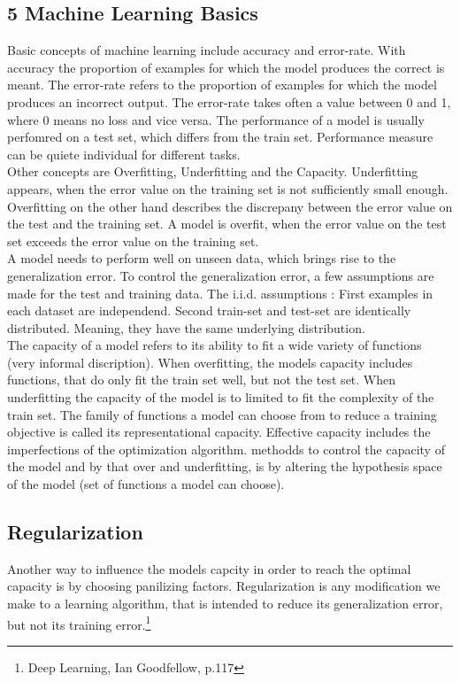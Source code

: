 \documentclass[12pt, a4paper]{article}
\begin{document}
	\subsection{5 Machine Learning Basics}
	Basic concepts of machine learning include accuracy and error-rate.	With accuracy the proportion of examples for which the model produces the correct is meant. The error-rate refers to the proportion of examples for which the model produces an incorrect output. The error-rate takes often a value between 0 and 1, where 0 means no loss and vice versa. The performance of a model is usually perfomred on a test set, which differs from the train set. Performance measure can be quiete individual for different tasks.\\
	Other concepts are Overfitting, Underfitting and the Capacity. Underfitting appears, when the error value on the training set is not sufficiently small enough. Overfitting on the other hand describes the discrepany between the error value on the test and the training set. A model is overfit, when the error value on the test set exceeds the error value on the training set.\\
	A model needs to perform well on unseen data, which brings rise to the generalization error. To control the generalization error, a few assumptions are made for the test and training data. The i.i.d. assumptions : First examples in each dataset are independend. Second train-set and test-set are identically distributed. Meaning, they have the same underlying distribution. \\
	The capacity of a model refers to its ability to fit a wide variety of functions (very informal discription). When overfitting, the models capacity includes functions, that do only fit the train set well, but not the test set. When underfitting the capacity of the model is to limited to fit the complexity of the train set. The family of functions a model can choose from to reduce a training objective is called its representational capacity. Effective capacity includes the imperfections of the optimization algorithm. methodds to control the capacity of the model and by that over and underfitting, is by altering the hypothesis space of the model (set of functions a model can choose).
	\subsection{Regularization}
	Another way to influence the models capcity in order to reach the optimal capacity is by choosing panilizing factors. Regularization is any modification we make to a learning algorithm, that is intended to reduce its generalization error, but not its training error.\footnote{Deep Learning, Ian Goodfellow, p.117}
\end{document}

